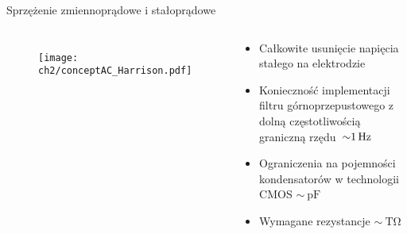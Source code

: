 


\begin{frame}{Sprzężenie zmiennoprądowe i stałoprądowe}
    

    \begin{columns}
        \vspace{-1em} %

        \begin{figure}[H]
            \centering
            \texttt{[image: ch2/conceptAC\_Harrison.pdf]} 
        \end{figure}
        \vspace{-2em} %

        {\renewcommand\normalsize{\small}%
        \normalsize
    
    
        \begin{exampleblock}{}

            \begin{itemize}
                \item Całkowite usunięcie napięcia stałego na elektrodzie 
                \item Konieczność implementacji filtru górnoprzepustowego z dolną częstotliwością graniczną rzędu~$\SI{\sim 1}{\hertz}$ 
                \item Ograniczenia na pojemności kondensatorów w technologii CMOS $\sim\SI{}{\pico\farad}$
                \item  Wymagane rezystancje  $\sim\SI{}{\tera\ohm}$
            \end{itemize}
        \end{exampleblock}
    
        }



\end{columns}
\end{frame}
